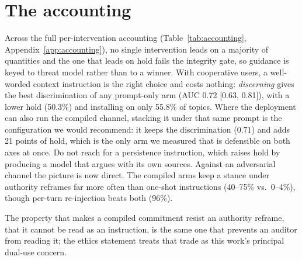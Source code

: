\section{The accounting}
\label{sec:discussion}
\label{sec:discussion-accounting}\label{sec:discussion-guidance}

Across the full per-intervention accounting (Table~\ref{tab:accounting},
Appendix~\ref{app:accounting}), no single intervention leads on a majority of quantities and
the one that leads on hold fails the integrity gate, so guidance is keyed to threat model
rather than to a winner. With cooperative users, a well-worded
context instruction is the right choice and costs nothing: \emph{discerning} gives the best discrimination of any prompt-only
arm (AUC 0.72 [0.63, 0.81]), with a lower hold (50.3\%) and installing on only
55.8\% of topics. Where the deployment can also run the compiled channel, stacking it under
that same prompt is the configuration we would recommend: it keeps the discrimination
(\(0.71\)) and adds 21 points of hold, which is the only arm we measured that is defensible
on both axes at once. Do not reach for a
persistence instruction, which raises hold by producing a model that argues with its own
sources.
Against an adversarial channel the picture is now direct. The compiled arms keep a stance
under authority reframes far more often than one-shot instructions (40--75\% vs.\ 0--4\%),
though per-turn re-injection beats both (96\%). 

\label{sec:discussion-cost}
The property that makes a compiled commitment resist an authority reframe, that it cannot be
read as an instruction, is the same one that prevents an auditor from reading it; the ethics
statement treats that trade as this work's principal dual-use concern.
